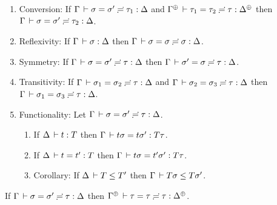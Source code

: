 \documentclass[acmlarge,review,anonymous]{acmart}\settopmatter{printfolios=true}
\begin{document}
\begin{lemma}
\label{lem:subeq}\bla
\begin{enumerate}
\item Conversion: If\/ $\Gamma \,\vdash \sigma = \sigma' \risingdotseq \tau_1 : \Delta$ and $\sueq {\resurrect\Gamma} {\tau_1} {\tau_2} {\tau} {\resurrect\Delta}$ then $\Gamma \,\vdash \sigma = \sigma' \risingdotseq \tau_2 : \Delta$.
\item Reflexivity: If\/ $\Gamma \,\vdash \sigma : \Delta$ then $\Gamma \,\vdash \sigma = \sigma \risingdotseq \sigma : \Delta$.
\item Symmetry:  If\/ $\Gamma \,\vdash \sigma = \sigma' \risingdotseq \tau : \Delta$ then $\Gamma \,\vdash \sigma' = \sigma \risingdotseq \tau : \Delta$.
\item Transitivity:  If\/ $\Gamma \,\vdash \sigma_1 = \sigma_2 \risingdotseq \tau : \Delta$ and $\Gamma \,\vdash \sigma_2 = \sigma_3 \risingdotseq \tau : \Delta$ then $\Gamma \,\vdash \sigma_1 = \sigma_3 \risingdotseq \tau : \Delta$.
\item Functionality: Let $\Gamma \,\vdash \sigma = \sigma' \risingdotseq \tau : \Delta$.
  \begin{enumerate}
  \item
  If $\Delta \,\vdash t : T$ then $\Gamma \,\vdash t\sigma = t\sigma' : T\tau$.
  \item
  If $\Delta \,\vdash t = t' : T$ then $\Gamma \,\vdash t\sigma = t'\sigma' : T\tau$.
  \item
  Corollary: If $\Delta \,\vdash T \leq T'$ then $\Gamma \,\vdash T\sigma \leq T\sigma'$.
  \end{enumerate}
\end{enumerate}
\end{lemma}
\begin{corollary}
  If\/ $\Gamma \,\vdash \sigma = \sigma' \risingdotseq \tau : \Delta$ then
  $\sueq {\resurrect \Gamma} \tau \tau \tau {\resurrect \Delta}$.
\end{corollary}
\end{document}
